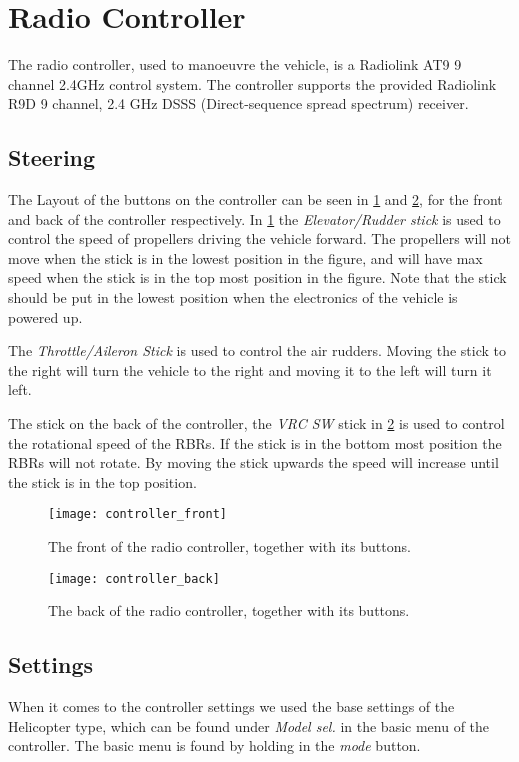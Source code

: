 \section{Radio Controller}
The radio controller, used to manoeuvre the vehicle, is a Radiolink AT9 9 channel
2.4GHz control system. The controller supports the provided Radiolink R9D
9 channel, 2.4 GHz DSSS (Direct-sequence spread spectrum) receiver.

\subsection{Steering}
The Layout of the buttons on the controller can be seen in
\cref{fig:controller_front} and \cref{fig:controller_back}, for the front and
back of the controller respectively. In \cref{fig:controller_front} the
\textit{Elevator/Rudder stick} is used to control the speed of propellers
driving the vehicle forward. The propellers will not move when the stick is in the
lowest position in the figure, and will have max speed when the stick is in the
top most position in the figure. Note that the stick should be put in the
lowest position when the electronics of the vehicle is powered up.

The \textit{Throttle/Aileron Stick} is used to control the air rudders. Moving
the stick to the right will turn the vehicle to the right and moving it to the
left will turn it left.

The stick on the back of the controller, the \textit{VRC SW} stick in
\cref{fig:controller_back} is used to control the rotational speed of the RBRs.
If the stick is in the bottom most position the RBRs will not rotate. By moving
the stick upwards the speed will increase until the stick is in the top
position.

\begin{figure}[h]
   \centering
   \texttt{[image: controller\_front]}
   \caption{The front of the radio controller, together with its buttons.}
   \label{fig:controller_front}
\end{figure}

\begin{figure}[h]
   \centering
   \texttt{[image: controller\_back]}
   \caption{The back of the radio controller, together with its buttons.}
   \label{fig:controller_back}
\end{figure}

\subsection{Settings}
When it comes to the controller settings we used the base settings of
the Helicopter type, which can be found under \textit{Model sel.} in the basic
menu of the controller. The basic menu is found by holding in the \textit{mode}
button.

